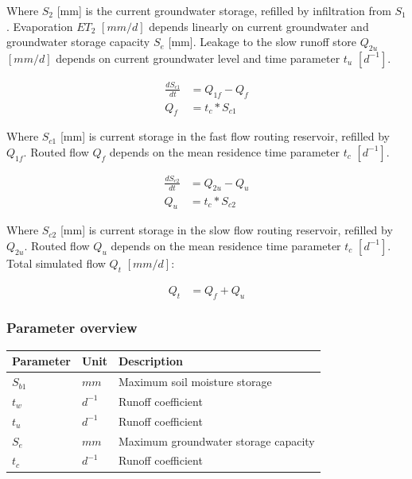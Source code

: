 Where $S_2$ [mm] is the current groundwater storage, refilled by infiltration from $S_1$. Evaporation $ET_2$ $[mm/d]$ depends linearly on current groundwater and groundwater storage capacity $S_e$ [mm]. Leakage to the slow runoff store $Q_{2u}$ $[mm/d]$ depends on current groundwater level and time parameter $t_u$ $[d^{-1}]$. 

\begin{align}
	\frac{dS_{c1}}{dt} &= Q_{1f}-Q_{f}\\
	Q_f &= t_c*S_{c1}
\end{align}

Where $S_{c1}$ [mm] is current storage in the fast flow routing reservoir, refilled by $Q_{1f}$. Routed flow $Q_f$ depends on the mean residence time parameter $t_c$ $[d^{-1}]$.

\begin{align}
	\frac{dS_{c2}}{dt} &= Q_{2u}-Q_{u}\\
	Q_u &= t_c*S_{c2}
\end{align}

Where $S_{c2}$ [mm] is current storage in the slow flow routing reservoir, refilled by $Q_{2u}$. Routed flow $Q_u$ depends on the mean residence time parameter $t_c$ $[d^{-1}]$. Total simulated flow $Q_t$ $[mm/d]$:

\begin{align}
	Q_t &= Q_f + Q_u
\end{align}

\subsubsection{Parameter overview}
\begin{table}[htbp]
  \centering
    \begin{tabular}{lll}
    \toprule
    Parameter & Unit  & Description \\
    \midrule
    $S_{b1}$ & $mm$  & Maximum soil moisture storage \\
    $t_w$ & $d^{-1}$ & Runoff coefficient \\
    $t_u$ & $d^{-1}$ & Runoff coefficient \\
    $S_e$ & $mm$  & Maximum groundwater storage capacity \\
    $t_c$ & $d^{-1}$ & Runoff coefficient \\
    \bottomrule
    \end{tabular}%
  \label{tab:addlabel}%
\end{table}%

